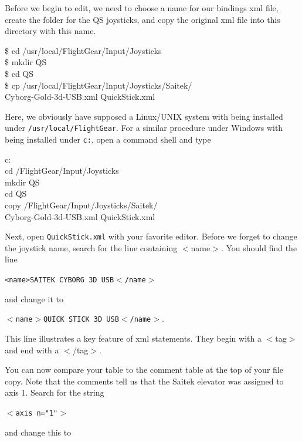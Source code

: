 Before we begin to edit, we need to choose a name for our bindings xml file, create the folder for the QS joysticks, and copy the original xml file into this directory with this name.
\medskip


\begin{ttfamily}
\noindent
\$ cd /usr/local/FlightGear/Input/Joysticks\\
\$ mkdir QS\\
\$ cd QS\\
\$ cp  /usr/local/FlightGear/Input/Joysticks/Saitek/\\
Cyborg-Gold-3d-USB.xml  QuickStick.xml
\end{ttfamily}
\medskip

\noindent
Here, we obviously have supposed a Linux/UNIX system with \FlightGear{} being installed under \texttt{/usr/local/FlightGear}. For a similar procedure under Windows with \FlightGear{} being installed under \texttt{c:\FlightGear}, open a command shell and type
\medskip

\begin{ttfamily}
\noindent
c:\\
cd /FlightGear/Input/Joysticks\\
mkdir QS\\
cd QS\\
copy  /FlightGear/Input/Joysticks/Saitek/\\
Cyborg-Gold-3d-USB.xml  QuickStick.xml
\end{ttfamily}
\medskip

\noindent
Next, open \texttt{QuickStick.xml} with your favorite editor.  Before we forget to change the joystick name, search for the line containing $<$name$>$.  You should find the line
\medskip

\texttt{<name>SAITEK CYBORG 3D USB$<$/name$>$}
\medskip

\noindent
and change it to
\medskip

	\texttt{$<$name$>$QUICK STICK 3D USB$<$/name$>$}.
	\medskip

\noindent
This line illustrates a key feature of xml statements.  They begin with a $<$tag$>$ and end with a $<$/tag$>$.

You can now compare your table to the comment table at the top of your file copy.  Note that the comments tell us that the Saitek elevator was assigned to axis 1.  Search for the string
\medskip

	\texttt{$<$axis n="1"$>$}
\medskip

\noindent
and change this to
\medskip

